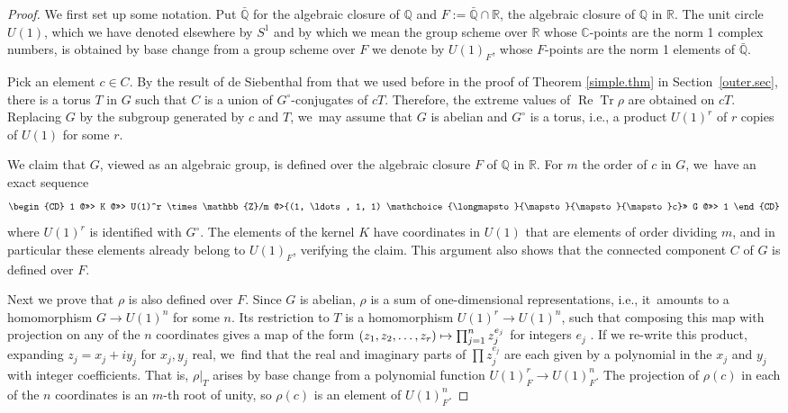\documentclass[JEP,XML,SOM,Unicode,NoFloatCountersInSection,published]{cedram}
\newcommand\mto{\mathchoice{\longmapsto}{\mapsto}{\mapsto}{\mapsto}}
\theoremstyle{definition}
\let\ic\circ
\newcommand{\R}{\mathbb{R}}
\newcommand{\Q}{\mathbb{Q}}
\newcommand{\C}{\mathbb{C}}
\newcommand{\Z}{\mathbb{Z}}
\DeclareMathOperator{\RE}{Re}
\renewcommand{\Re}{\RE}
\DeclareMathOperator{\Tr}{Tr}
\newcommand{\Qalg}{\bar{\Q}}
\begin{document}
\begin{proof}
We first set up some notation. Put $\Qalg$ for the algebraic closure of $\Q$ and $F := \Qalg \cap \R$, the algebraic closure of $\Q$ in $\R$.
The unit circle $U(1)$, which we have denoted elsewhere by $S^1$ and by which we mean the group scheme over $\R$ whose $\C$-points are the norm 1 complex numbers, is obtained by base change from a group scheme over $F$ we denote by $U(1)_F$, whose $F$-points are the norm 1 elements of $\Qalg$.

Pick an element $c \in C$. By the result of de Siebenthal from \cite{Sieb} that we used before in the proof of Theorem \ref{simple.thm} in Section~\ref{outer.sec}, there is a torus $T$ in $G$ such that $C$ is a union of $G^\ic$-conjugates of $cT$. Therefore,
the extreme values of $\Re \Tr \rho$ are obtained on $cT$. Replacing $G$ by the subgroup generated by $c$ and $T$, we~may assume that $G$ is abelian and $G^\ic$ is a torus, i.e., a product $U(1)^r$ of $r$ copies of $U(1)$ for some $r$.

We claim that $G$, viewed as an algebraic group, is defined over the algebraic closure $F$ of $\Q$ in $\R$.
For $m$ the order of $c$ in $G$, we~have an exact sequence
\[
\begin{CD}
1 @>>> K @>>> U(1)^r \times \Z/m @>{(1, \ldots, 1, 1) \mto c}>> G @>>> 1
\end{CD}
\]
where $U(1)^r$ is identified with $G^\ic$. The elements of the kernel $K$ have coordinates in $U(1)$ that are elements of order dividing $m$, and in particular these elements already belong to $U(1)_F$, verifying the claim.
This argument also shows that the connected component $C$ of $G$ is defined over $F$.

Next we prove that $\rho$ is also defined over $F$.
Since $G$ is abelian, $\rho$ is a sum of one-dimensional representations, i.e., it~amounts to a homomorphism $G \to U(1)^n$ for some $n$. Its restriction to $T$ is a homomorphism $U(1)^r \to U(1)^n$, such that composing this map with projection on any of the $n$ coordinates gives a map of the form $(z_1, z_2, \ldots, z_r) \mto \prod_{j=1}^n z_j^{e_j}$ for integers $e_j$ \cite[\S{IX.7}]{Bou:g7}.
If we re-write this product, expanding $z_j = x_j + iy_j$ for $x_j, y_j$ real, we~find that the real and imaginary parts of $\prod z_j^{e_j}$ are each given by a polynomial in the $x_j$ and $y_j$ with integer coefficients. That is, $\rho\vert_T$ arises by base change from a polynomial function $U(1)_F^r \to U(1)_F^n$. The projection of $\rho(c)$ in each of the $n$ coordinates is an $m$-th root of unity, so $\rho(c)$ is an element of $U(1)_F^n$.


\end{proof}
\end{document}
